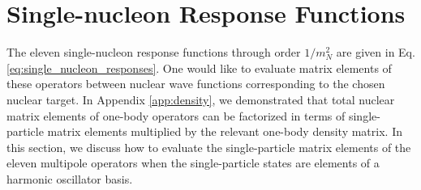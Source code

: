 \documentclass{book}[12pt]
\begin{document}
\chapter{Single-nucleon Response Functions}
\label{app:single_nucleon_response}
The eleven single-nucleon response functions through order $1/m_N^2$ are given in Eq. \ref{eq:single_nucleon_responses}. One would like to evaluate matrix elements of these operators between nuclear wave functions corresponding to the chosen nuclear target. In Appendix \ref{app:density}, we demonstrated that total nuclear matrix elements of one-body operators can be factorized in terms of single-particle matrix elements multiplied by the relevant one-body density matrix. In this section, we discuss how to evaluate the single-particle matrix elements of the eleven multipole operators when the single-particle states are elements of a harmonic oscillator basis. 
\end{document}

